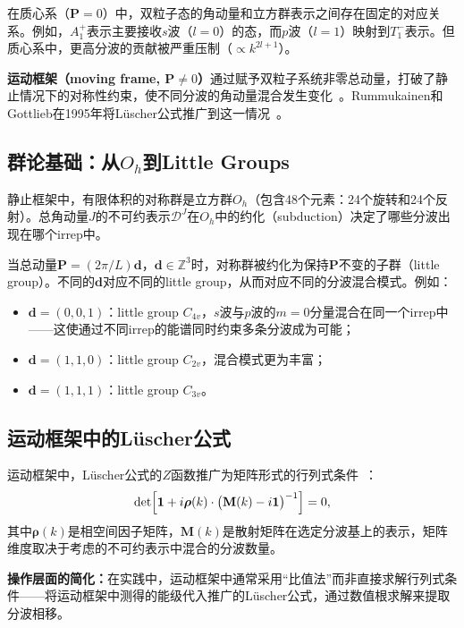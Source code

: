 \documentclass[12pt,a4paper]{ctexart}
\theoremstyle{definition}
\begin{document}
在质心系（$\mathbf{P}=0$）中，双粒子态的角动量和立方群表示之间存在固定的对应关系。例如，$A_1^+$表示主要接收$s$波（$l=0$）的态，而$p$波（$l=1$）映射到$T_1^-$表示。但质心系中，更高分波的贡献被严重压制（$\propto k^{2l+1}$）。

\textbf{运动框架（moving frame, $\mathbf{P} \neq 0$）}通过赋予双粒子系统非零总动量，打破了静止情况下的对称性约束，使不同分波的角动量混合发生变化~\cite{GattringerLang2010}。Rummukainen和Gottlieb在1995年将L\"uscher公式推广到这一情况~\cite{GattringerLang2010}。

\subsection{群论基础：从$O_h$到Little Groups}

静止框架中，有限体积的对称群是立方群$O_h$（包含48个元素：24个旋转和24个反射）。总角动量$J$的不可约表示$\mathcal{D}^J$在$O_h$中的约化（subduction）决定了哪些分波出现在哪个irrep中。

当总动量$\mathbf{P} = (2\pi/L)\mathbf{d}$，$\mathbf{d} \in \mathbb{Z}^3$时，对称群被约化为保持$\mathbf{P}$不变的子群（little group）。不同的$\mathbf{d}$对应不同的little group，从而对应不同的分波混合模式。例如：
\begin{itemize}[leftmargin=*]
    \item $\mathbf{d} = (0,0,1)$：little group $C_{4v}$，$s$波与$p$波的$m=0$分量混合在同一个irrep中——这使通过不同irrep的能谱同时约束多条分波成为可能；
    \item $\mathbf{d} = (1,1,0)$：little group $C_{2v}$，混合模式更为丰富；
    \item $\mathbf{d} = (1,1,1)$：little group $C_{3v}$。
\end{itemize}

\subsection{运动框架中的L\"uscher公式}

运动框架中，L\"uscher公式的$Z$函数推广为矩阵形式的行列式条件~\cite{GattringerLang2010}：
\begin{equation}\label{eq:moving_frame}
    \det\Bigl[ \mathbf{1} + i\boldsymbol{\rho}(k) \cdot \bigl(\mathbf{M}(k) - i\mathbf{1}\bigr)^{-1} \Bigr] = 0,
\end{equation}
其中$\boldsymbol{\rho}(k)$是相空间因子矩阵，$\mathbf{M}(k)$是散射矩阵在选定分波基上的表示，矩阵维度取决于考虑的不可约表示中混合的分波数量。

\textbf{操作层面的简化：}在实践中，运动框架中通常采用``比值法''而非直接求解行列式条件——将运动框架中测得的能级代入推广的L\"uscher公式，通过数值根求解来提取分波相移。
\end{document}
